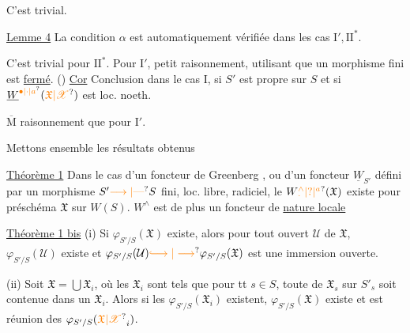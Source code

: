C'est trivial.

\uline{Lemme 4} La condition $\alpha$ est automatiquement vérifiée dans les cas $\mathrm{I}',\mathrm{II}^{*}$.

C'est trivial pour $\mathrm{II}^{*}$. Pour $\mathrm{I}'$, petit raisonnement, utilisant que un morphisme fini est \uline{fermé}. ()
\uline{Cor} Conclusion  dans le cas $\mathrm I$, si $S'$ est propre sur $S$ et si $\underline W^{\unsure{\bullet|\cdot|a}}(\unsure{\mathfrak X|\mathscr X})$ est loc. noeth.

$\overline{\mathrm M}$ raisonnement que pour $\mathrm I'$.

Mettons ensemble les résultats obtenus

\uline{Théorème 1} Dans le cas d'un foncteur de Greenberg , ou d'un foncteur $\underline W_{S'}$ défini
par un morphisme $S'\unsure{\longrightarrow|\text{---}}S$ fini, loc. libre,  radiciel, le $W\unsure{^{\wedge}_{\cdot}|?|^{a}}(\mathfrak X)$ existe pour  préschéma $\mathfrak X$ sur $W(S)$.  $W^{\wedge}$ est de plus un foncteur de \uline{nature locale}

\uline{Théorème 1 bis}    (i) Si $\varphi_{S'/S}(\mathfrak X)$ existe, alors pour tout ouvert $\mathcal U$ de $\mathfrak X$, $\varphi_{S'/S}(\mathcal U)$ existe et $\varphi_{S'/S}(\mathcal U)\unsure{\lhook\joinrel\longrightarrow|\longrightarrow}\varphi_{S'/S}(\mathfrak X)$ est une immersion ouverte.

(ii) Soit $\mathfrak X=\bigcup\mathfrak X_i$, où les $\mathfrak X_i$ sont tels que pour tt $s\in S$, toute   de $\mathfrak X_s$ sur $S'_s$ soit contenue dans un $\mathfrak X_i$. Alors si les $\varphi_{S'/S}(\mathfrak X_i)$ existent, $\varphi_{S'/S}(\mathfrak X)$
existe et est réunion des $\varphi_{S'/S}(\unsure{\mathfrak X|\mathscr X}_i)$.

